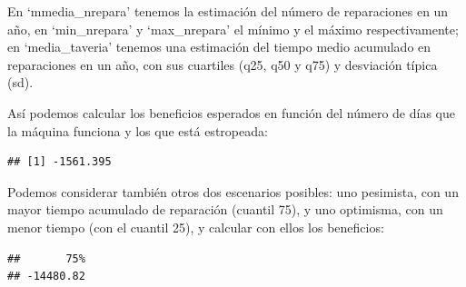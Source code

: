 \documentclass[
]{book}
\newenvironment{Shaded}{\begin{snugshade}}{\end{snugshade}}
\newcommand{\CommentTok}[1]{\textcolor[rgb]{0.56,0.35,0.01}{\textit{#1}}}
\newcommand{\DecValTok}[1]{\textcolor[rgb]{0.00,0.00,0.81}{#1}}
\newcommand{\NormalTok}[1]{#1}
\newcommand{\SpecialCharTok}[1]{\textcolor[rgb]{0.00,0.00,0.00}{#1}}
\theoremstyle{definition}
\theoremstyle{definition}
\theoremstyle{definition}
\theoremstyle{definition}
\theoremstyle{remark}
\begin{document}
En `mmedia\_nrepara' tenemos la estimación del número de reparaciones en un año, en `min\_nrepara' y `max\_nrepara' el mínimo y el máximo respectivamente; en `media\_taveria' tenemos una estimación del tiempo medio acumulado en reparaciones en un año, con sus cuartiles (q25, q50 y q75) y desviación típica (sd).

Así podemos calcular los beneficios esperados en función del número de días que la máquina funciona y los que está estropeada:

\begin{Shaded}
\end{Shaded}

\begin{verbatim}
## [1] -1561.395
\end{verbatim}

Podemos considerar también otros dos escenarios posibles: uno pesimista, con un mayor tiempo acumulado de reparación (cuantil 75), y uno optimisma, con un menor tiempo (con el cuantil 25), y calcular con ellos los beneficios:

\begin{Shaded}
\end{Shaded}

\begin{verbatim}
##       75% 
## -14480.82
\end{verbatim}

\begin{Shaded}
\end{Shaded}
\end{document}
